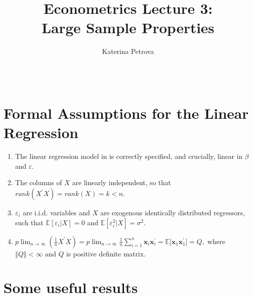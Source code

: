\documentclass[notes=show]{beamer}
\begin{document}
\title{Econometrics Lecture 3: \\
Large Sample Properties}
\author{Katerina Petrova \ \ \ \ \ \ \ \ \ \ \ \ \ \ \ \ \ \ \ \ \ \ \ \ \ \
\ \ \ \ \ \ \ \ \ \ \ \ \ \ \ \ \ \ \ \ \ \ \ \ \ \ \ \ \ \ \ \ \ \ \ \ \ \
\ \ \ \ \ \ \ \ \ \ \ \ \ \ \ \ \ \ \ \ \ \ \ }
\date{}
\maketitle

\section{Formal Assumptions for the Linear Regression}

\begin{frame}%


\begin{enumerate}
\item The linear regression model in is correctly specified, and crucially,
linear in $\beta $ and $\varepsilon .$

\item The columns of $X$ are linearly independent, so that $rank(X^{\prime
}X)=rank(X)=k<n.$

\item $\varepsilon _{i}$ are i.i.d. variables and $X$ are exogenous
identically distributed regressors, such that $\mathbb{E}[\varepsilon
_{i}|X]=0$ and $\mathbb{E}[\varepsilon _{i}^{2}|X]=\sigma ^{2}.$

\item $p\lim_{n\rightarrow \infty }(\frac{1}{n}X^{\prime
}X)=p\lim_{n\rightarrow \infty }\frac{1}{n}\sum_{i=1}^{n}\mathbf{x}_{i}%
\mathbf{x}_{i}^{\prime }=\mathbb{E[}\mathbf{x}_{1}\mathbf{x}_{1}^{\prime
}]=Q,$ where $\left\Vert Q\right\Vert <\infty $ and $Q$ is positive definite
matrix.
\end{enumerate}

\end{frame}%

\section{Some useful results}
\end{document}
